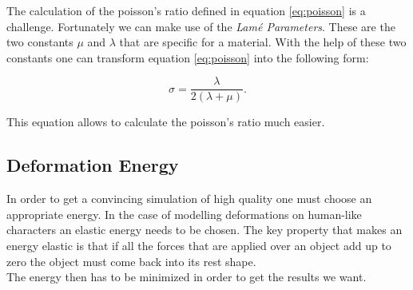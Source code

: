 The calculation of the poisson's ratio defined in equation \ref{eq:poisson} is a challenge. Fortunately we can make use of the \textit{Lamé Parameters}. These are the two constants $\mu$ and $\lambda$ that are specific for a material. With the help of these two constants one can transform equation \ref{eq:poisson} into the following form:

\begin{equation}\label{eq:poisson_ratio}
\sigma =  \frac{\lambda}{2(\lambda + \mu)}.
\end{equation}

This equation allows to calculate the poisson's ratio much easier. 




\subsection{Deformation Energy}
In order to get a convincing simulation of high quality one must choose an appropriate energy. In the case of modelling deformations on human-like characters an elastic energy needs to be chosen. The key property that makes an energy elastic is that if all the forces that are applied over an object add up to zero the object must come back into its rest shape.
\\
The energy then has to be minimized in order to get the results we want.






